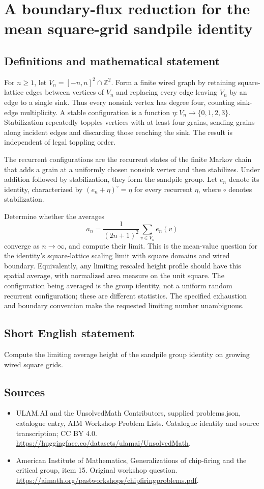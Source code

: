 \documentclass[11pt,a4paper]{article}
\begin{document}
\section*{A boundary-flux reduction for the mean square-grid sandpile identity}\label{statement}

\subsection{Definitions and mathematical statement}
For $n\geq1$, let $V_n=[-n,n]^2\cap\mathbb Z^2$.
Form a finite wired graph by retaining square-lattice edges between vertices of $V_n$ and replacing every edge leaving $V_n$ by an edge to a single sink.
Thus every nonsink vertex has degree four, counting sink-edge multiplicity.
A stable configuration is a function $\eta:V_n\to\{0,1,2,3\}$.
Stabilization repeatedly topples vertices with at least four grains, sending grains along incident edges and discarding those reaching the sink.
The result is independent of legal toppling order.

The recurrent configurations are the recurrent states of the finite Markov chain that adds a grain at a uniformly chosen nonsink vertex and then stabilizes.
Under addition followed by stabilization, they form the sandpile group.
Let $e_n$ denote its identity, characterized by
$(e_n+\eta)^\circ=\eta$ for every recurrent $\eta$, where $\circ$ denotes stabilization.

Determine whether the averages
\[
 a_n=\frac{1}{(2n+1)^2}\sum_{v\in V_n}e_n(v)
\]
converge as $n\to\infty$, and compute their limit.
This is the mean-value question for the identity's square-lattice scaling limit with square domains and wired boundary.
Equivalently, any limiting rescaled height profile should have this spatial average, with normalized area measure on the unit square.
The configuration being averaged is the group identity, not a uniform random recurrent configuration; these are different statistics.
The specified exhaustion and boundary convention make the requested limiting number unambiguous.
\subsection{Short English statement}
Compute the limiting average height of the sandpile group identity on growing wired square grids.
\subsection{Sources}
\begin{itemize}
\item[S1] ULAM.AI and the UnsolvedMath Contributors, supplied problems.json, catalogue entry, AIM Workshop Problem Lists. Catalogue identity and source transcription; CC BY 4.0.
\url{https://huggingface.co/datasets/ulamai/UnsolvedMath}.
\item[S2] American Institute of Mathematics, Generalizations of chip-firing and the critical group, item 15. Original workshop question.
\url{https://aimath.org/pastworkshops/chipfiringproblems.pdf}.
\end{itemize}
\end{document}

